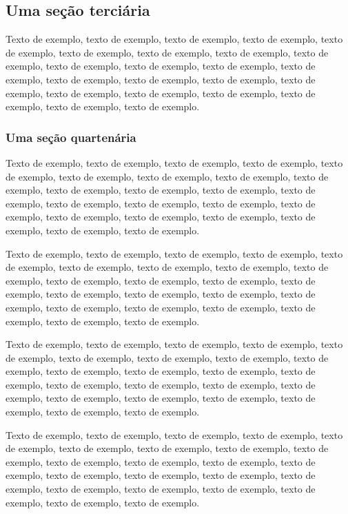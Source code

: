 \documentclass[
	12pt,				%
	oneside,			%
	a4paper,			%
	english,			%
	brazil				%
	]{abntex2ppgsi}
\begin{document}
\subsection{Uma seção terciária}

Texto de exemplo, texto de exemplo, texto de exemplo, texto de exemplo, texto de exemplo, texto de exemplo, texto de exemplo, texto de exemplo, texto de exemplo, texto de exemplo, texto de exemplo, texto de exemplo, texto de exemplo, texto de exemplo, texto de exemplo, texto de exemplo, texto de exemplo, texto de exemplo, texto de exemplo, texto de exemplo, texto de exemplo, texto de exemplo, texto de exemplo.

\subsubsection{Uma seção quartenária}

Texto de exemplo, texto de exemplo, texto de exemplo, texto de exemplo, texto de exemplo, texto de exemplo, texto de exemplo, texto de exemplo, texto de exemplo, texto de exemplo, texto de exemplo, texto de exemplo, texto de exemplo, texto de exemplo, texto de exemplo, texto de exemplo, texto de exemplo, texto de exemplo, texto de exemplo, texto de exemplo, texto de exemplo, texto de exemplo, texto de exemplo.


Texto de exemplo, texto de exemplo, texto de exemplo, texto de exemplo, texto de exemplo, texto de exemplo, texto de exemplo, texto de exemplo, texto de exemplo, texto de exemplo, texto de exemplo, texto de exemplo, texto de exemplo, texto de exemplo, texto de exemplo, texto de exemplo, texto de exemplo, texto de exemplo, texto de exemplo, texto de exemplo, texto de exemplo, texto de exemplo, texto de exemplo.


Texto de exemplo, texto de exemplo, texto de exemplo, texto de exemplo, texto de exemplo, texto de exemplo, texto de exemplo, texto de exemplo, texto de exemplo, texto de exemplo, texto de exemplo, texto de exemplo, texto de exemplo, texto de exemplo, texto de exemplo, texto de exemplo, texto de exemplo, texto de exemplo, texto de exemplo, texto de exemplo, texto de exemplo, texto de exemplo, texto de exemplo.


Texto de exemplo, texto de exemplo, texto de exemplo, texto de exemplo, texto de exemplo, texto de exemplo, texto de exemplo, texto de exemplo, texto de exemplo, texto de exemplo, texto de exemplo, texto de exemplo, texto de exemplo, texto de exemplo, texto de exemplo, texto de exemplo, texto de exemplo, texto de exemplo, texto de exemplo, texto de exemplo, texto de exemplo, texto de exemplo, texto de exemplo.
\end{document}
